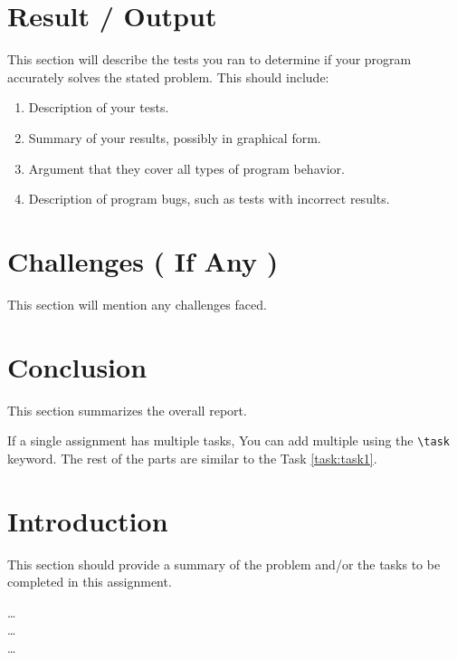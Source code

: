\documentclass[12pt]{report}
\begin{document}
    \section{Result / Output}
    This section will describe the tests you ran to determine if your program accurately solves the stated problem. This should include:
    \begin{enumerate}
        \item Description of your tests.
        \item Summary of your results, possibly in graphical form.
        \item Argument that they cover all types of program behavior.
        \item Description of program bugs, such as tests with incorrect results.
    \end{enumerate}

    \section{Challenges ( If Any )}
    This section will mention any challenges faced.
    
    \section{Conclusion}
    This section summarizes the overall report.



    If a single assignment has multiple tasks, You can add multiple using the \texttt{\textbackslash task} keyword. The rest of the parts are similar to the Task \ref{task:task1}.
    \section{Introduction}
    This section should provide a summary of the problem and/or the tasks to be completed in this assignment.

    \noindent
    \ldots\\
    \ldots\\
    \ldots\\
\end{document}
